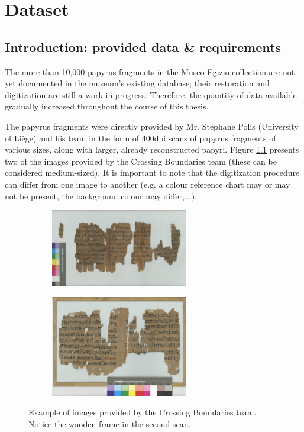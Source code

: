\documentclass[11pt]{report}
\begin{document}
\chapter{Dataset}

\section{Introduction: provided data \& requirements}

The more than 10,000 papyrus fragments in the Museo Egizio collection are not yet documented in the museum's existing database; their restoration and digitization are still a work in progress. Therefore, the quantity of data available gradually increased throughout the course of this thesis.\newline

The papyrus fragments were directly provided by Mr. Stéphane Polis (University of Liège) and his team in the form of 400dpi scans of papyrus fragments of various sizes, along with larger, already reconstructed papyri. Figure \ref{imageex} presents two of the images provided by the Crossing Boundaries team (these can be considered medium-sized). It is important to note that the digitization procedure can differ from one image to another (e.g. a colour reference chart may or may not be present, the background colour may differ,...).

\begin{figure}[h!]
\centering
  \begin{subfigure}{7cm}
    \centering\includegraphics[width=6cm]{papy.PNG}
  \end{subfigure}
  \begin{subfigure}{7cm}
    \centering\includegraphics[width=6cm]{papy2.png}
  \end{subfigure}
\caption{Example of images provided by the Crossing Boundaries team. Notice the wooden frame in the second scan.}
\label{imageex}
\end{figure}
\end{document}
